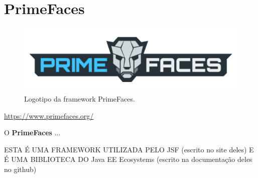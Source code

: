 \section{PrimeFaces}
\label{subsec:primefaces}

\begin{figure}[H]
    \centering
    \includegraphics[scale=0.25]{images/primefaces.png}
    \caption{Logotipo da framework PrimeFaces.}
    \label{fig:primefaces}
\end{figure}

\href{https://www.primefaces.org/}{https://www.primefaces.org/}

\hspace{5mm} O \textbf{PrimeFaces} ...

ESTA É UMA FRAMEWORK UTILIZADA PELO JSF (escrito no site deles) E É UMA BIBLIOTECA DO Java EE Ecosystems (escrito na documentação deles no github)